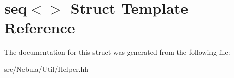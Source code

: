 \hypertarget{structseq}{\section{seq$<$$>$ Struct Template Reference}
\label{structseq}
}


The documentation for this struct was generated from the following file\-:\begin{DoxyCompactItemize}
\item 
src/\-Nebula/\-Util/Helper.\-hh\end{DoxyCompactItemize}
